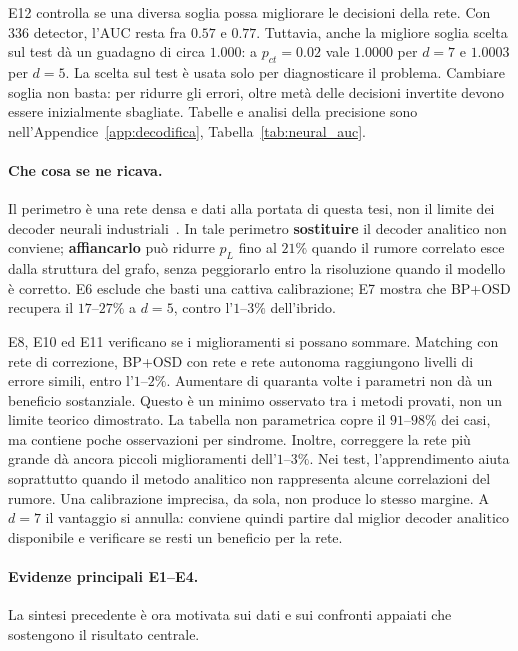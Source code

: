 \begin{onehalfspace}
E12 controlla se una diversa soglia possa migliorare le decisioni della rete. Con 336 detector, l'AUC resta fra $0.57$ e $0.77$. Tuttavia, anche la migliore soglia scelta sul test dà un guadagno di circa $1.000$: a $p_{ct}=0.02$ vale $1.0000$ per $d=7$ e $1.0003$ per $d=5$. La scelta sul test è usata solo per diagnosticare il problema. Cambiare soglia non basta: per ridurre gli errori, oltre metà delle decisioni invertite devono essere inizialmente sbagliate. Tabelle e analisi della precisione sono nell'Appendice~\ref{app:decodifica}, Tabella~\ref{tab:neural_auc}.

\paragraph{Che cosa se ne ricava.}
Il perimetro è una rete densa e dati alla portata di questa tesi, non il
limite dei decoder neurali industriali~\cite{alphaqubit2026}. In tale
perimetro \textbf{sostituire} il decoder analitico non conviene;
\textbf{affiancarlo} può ridurre $p_L$ fino al $21\%$ quando il rumore
correlato esce dalla struttura del grafo, senza peggiorarlo entro la
risoluzione quando il modello è corretto. E6 esclude che basti una cattiva
calibrazione; E7 mostra che BP+OSD recupera il $17$--$27\%$ a $d=5$,
contro l'$1$--$3\%$ dell'ibrido.

E8, E10 ed E11 verificano se i miglioramenti si possano sommare. Matching con rete di correzione, BP+OSD con rete e rete autonoma raggiungono livelli di errore simili, entro l'$1$--$2\%$. Aumentare di quaranta volte i parametri non dà un beneficio sostanziale. Questo è un minimo osservato tra i metodi provati, non un limite teorico dimostrato. La tabella non parametrica copre il $91$--$98\%$ dei casi, ma contiene poche osservazioni per sindrome. Inoltre, correggere la rete più grande dà ancora piccoli miglioramenti dell'$1$--$3\%$. Nei test, l'apprendimento aiuta soprattutto quando il metodo analitico non rappresenta alcune correlazioni del rumore. Una calibrazione imprecisa, da sola, non produce lo stesso margine. A $d=7$ il vantaggio si annulla: conviene quindi partire dal miglior decoder analitico disponibile e verificare se resti un beneficio per la rete.

\paragraph{Evidenze principali E1--E4.}
La sintesi precedente è ora motivata sui dati e sui confronti appaiati che
sostengono il risultato centrale.
\decoderbodytrue

\decoderbodyfalse

\end{onehalfspace}
